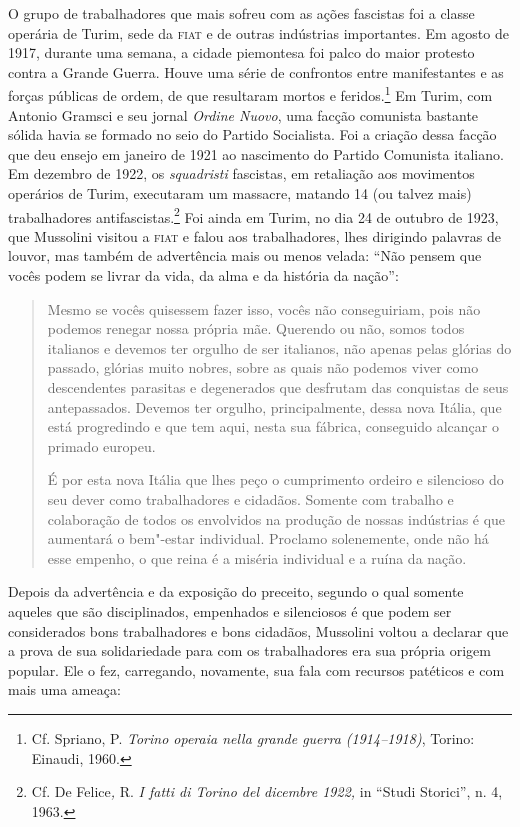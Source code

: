 O grupo de trabalhadores que mais sofreu com as ações fascistas foi a
classe operária de Turim, sede da \textsc{fiat} e de outras indústrias
importantes. Em agosto de 1917, durante uma semana, a cidade piemontesa
foi palco do maior protesto contra a Grande Guerra. Houve uma série de
confrontos entre manifestantes e as forças públicas de ordem, de que
resultaram mortos e feridos.\footnote{Cf. Spriano, P. \emph{Torino
  operaia nella grande guerra (1914--1918)}, Torino: Einaudi, 1960.} Em
Turim, com Antonio Gramsci e seu jornal \emph{Ordine Nuovo}, uma facção
comunista bastante sólida havia se formado no seio do Partido
Socialista. Foi a criação dessa facção que deu ensejo em janeiro de 1921
ao nascimento do Partido Comunista italiano. Em dezembro de 1922, os
\emph{squadristi} fascistas, em retaliação aos movimentos operários de
Turim, executaram um massacre, matando 14 (ou talvez mais) trabalhadores
antifascistas.\footnote{Cf. De Felice\emph{,} R. \emph{I fatti di Torino
  del dicembre 1922,} in ``Studi Storici'', n. 4, 1963.} Foi ainda em
Turim, no dia 24 de outubro de 1923, que Mussolini visitou a \textsc{fiat}
e falou aos trabalhadores, lhes dirigindo palavras de louvor, mas também
de advertência mais ou menos velada: ``Não pensem que vocês podem se
livrar da vida, da alma e da história da nação'':

\begin{quote}
Mesmo se vocês quisessem fazer isso, vocês não conseguiriam, pois não
podemos renegar nossa própria mãe. Querendo ou não, somos todos
italianos e devemos ter orgulho de ser italianos, não apenas pelas
glórias do passado, glórias muito nobres, sobre as quais não podemos
viver como descendentes parasitas e degenerados que desfrutam das
conquistas de seus antepassados. Devemos ter orgulho, principalmente,
dessa nova Itália, que está progredindo e que tem aqui, nesta sua
fábrica, conseguido alcançar o primado europeu.

É por esta nova Itália que lhes peço o cumprimento ordeiro e silencioso
do seu dever como trabalhadores e cidadãos. Somente com trabalho e
colaboração de todos os envolvidos na produção de nossas indústrias é
que aumentará o bem"-estar individual. Proclamo solenemente, onde não há
esse empenho, o que reina é a miséria individual e a ruína da nação.
\end{quote}

Depois da advertência e da exposição do preceito, segundo o qual somente
aqueles que são disciplinados, empenhados e silenciosos é que podem ser
considerados bons trabalhadores e bons cidadãos, Mussolini voltou a
declarar que a prova de sua solidariedade para com os trabalhadores era
sua própria origem popular. Ele o fez, carregando, novamente, sua fala
com recursos patéticos e com mais uma ameaça:

